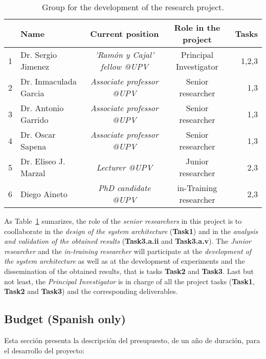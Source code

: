 \documentclass[10pt,a4paper]{paper}
\begin{document}
\begin{table}[]
\begin{footnotesize}  
\begin{tabular}{llccr}
 & {\bf Name} & {\bf Current position} & {\bf Role in the project} & {\bf Tasks}\\\hline
1 & Dr. Sergio Jimenez  &  {\em 'Ramón y Cajal' fellow @UPV}  &  Principal Investigator & 1,2,3\\
2 & Dr. Inmaculada Garcia  & {\em Associate professor @UPV}   &  Senior researcher & 1,3\\
3 & Dr. Antonio Garrido & {\em Associate professor @UPV}   &  Senior researcher & 1,3\\
4 & Dr. Oscar Sapena & {\em Associate professor @UPV}   &  Senior researcher & 1,3\\
5 & Dr. Eliseo J. Marzal & {\em Lecturer @UPV} & Junior researcher & 2,3\\
6 & Diego Aineto & {\em PhD candidate @UPV} & in-Training researcher  & 2,3
\end{tabular}
\end{footnotesize}
\caption{\small Group for the development of the research project.}
\label{tab:group}
\end{table}

As Table~\ref{tab:group} sumarizes, the role of the {\em senior researchers} in this project is to coollaborate in the {\em design of the system architecture} ({\bf Task1}) and in the {\em analysis and validation of the obtained results} ({\bf Task3.a.ii} and {\bf Task3.a.v}). The {\em Junior researcher} and the {\em in-training researcher} will participate at the {\em development of the system architecture} as well as at the development of experiments and the dissemination of the obtained results, that is tasks {\bf Task2} and {\bf Task3}. Last but not least, the {\em Principal Investigator} is in charge of all the project tasks ({\bf Task1}, {\bf Task2} and {\bf Task3}) and the corresponding deliverables.


\subsection{Budget (Spanish only)} 
Esta sección presenta la descripción del presupuesto, de un año de duración, para el desarrollo del proyecto:
\end{document}
